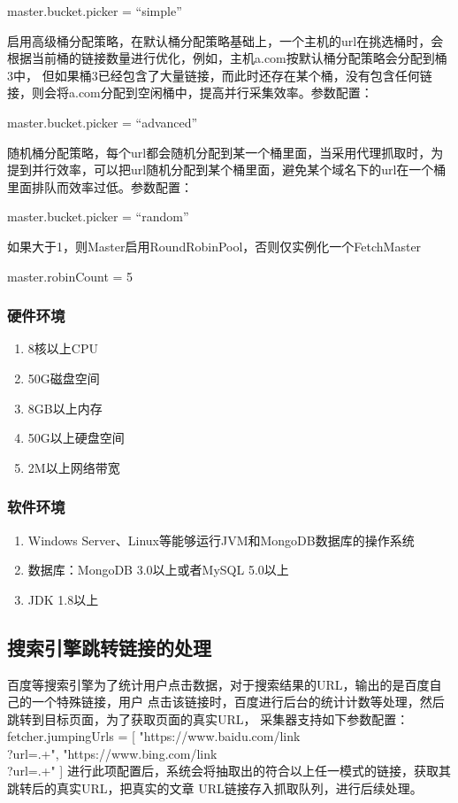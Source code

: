 master.bucket.picker = ``simple''

启用高级桶分配策略，在默认桶分配策略基础上，一个主机的url在挑选桶时，会根据当前桶的链接数量进行优化，例如，主机a.com按默认桶分配策略会分配到桶3中，
但如果桶3已经包含了大量链接，而此时还存在某个桶，没有包含任何链接，则会将a.com分配到空闲桶中，提高并行采集效率。参数配置：

master.bucket.picker = ``advanced''

随机桶分配策略，每个url都会随机分配到某一个桶里面，当采用代理抓取时，为提到并行效率，可以把url随机分配到某个桶里面，避免某个域名下的url在一个桶里面排队而效率过低。参数配置：

master.bucket.picker = ``random''


如果大于1，则Master启用RoundRobinPool，否则仅实例化一个FetchMaster

master.robinCount = 5


\subsubsection{硬件环境}

\begin{enumerate}
\item 8核以上CPU
\item 50G磁盘空间
\item 8GB以上内存
\item 50G以上硬盘空间
\item 2M以上网络带宽
\end{enumerate}

\subsubsection{软件环境}

\begin{enumerate}
\item Windows Server、Linux等能够运行JVM和MongoDB数据库的操作系统
\item 数据库：MongoDB 3.0以上或者MySQL 5.0以上
\item JDK 1.8以上
\end{enumerate}


\subsection{搜索引擎跳转链接的处理}
百度等搜索引擎为了统计用户点击数据，对于搜索结果的URL，输出的是百度自己的一个特殊链接，用户
点击该链接时，百度进行后台的统计计数等处理，然后跳转到目标页面，为了获取页面的真实URL，
采集器支持如下参数配置：
fetcher.jumpingUrls = [
                           "https://www.baidu.com/link\\?url=.+",
                           "https://www.bing.com/link\\?url=.+"
                         ]
进行此项配置后，系统会将抽取出的符合以上任一模式的链接，获取其跳转后的真实URL，把真实的文章
URL链接存入抓取队列，进行后续处理。

